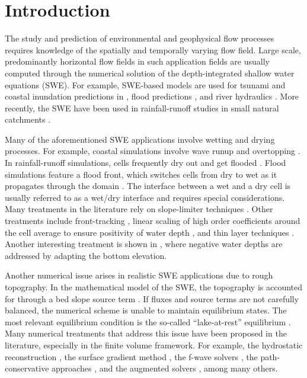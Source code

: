 \section{Introduction}

The study and prediction of environmental and geophysical flow
processes requires knowledge of the spatially and temporally varying
flow field.  Large scale, predominantly horizontal flow fields in such
application fields are usually computed through the numerical solution
of the depth-integrated shallow water equations (SWE).  For example,
SWE-based models are used for tsunami and coastal inundation
predictions in \cite{Marras:2016, Vater2019, Qin:2019}, flood
predictions \cite{George2011, Echeverribar2019}, and river hydraulics
\cite{Persi:2019}.  More recently, the SWE have been used in
rainfall-runoff studies in small natural catchments \cite{Mugler2011,
  Lacasta2014, Simons2014, Xia2019, CaviedesVoullieme2020}.

Many of the aforementioned SWE applications involve wetting and drying
processes.  For example, coastal simulations involve wave runup and
overtopping \cite{Vater20151, Medeiros2013, Vater2019}. In
rainfall-runoff simulations, cells frequently dry out and get flooded
\cite{Simons2014, Lacasta2014, Xia2017}. Flood simulations feature a
flood front, which switches cells from dry to wet as it propagates
through the domain \cite{George2011}.  The interface between a wet and
a dry cell is usually referred to as a wet/dry interface
\cite{Bollermann2013, Beisiegel2015} and requires special
considerations.  Many treatments in the literature rely on
slope-limiter techniques \cite{Beisiegel2015, Vater20151, Vater2019,
  Le:2020}.  Other treatments include front-tracking \cite{ref1,
  Ambati2007452}, linear scaling of high order coefficients around the
cell average to ensure positivity of water depth \cite{xing2010,
  Marras:2016}, and thin layer techniques \cite{ern2008, cotoJe,
  Lee:2016}. Another interesting treatment is shown in
\cite{Karna:2011}, where negative water depths are addressed by
adapting the bottom elevation.

Another numerical issue arises in realistic SWE applications due to
rough topography.  In the mathematical model of the SWE, the
topography is accounted for through a bed slope source term
\cite{Kesserwani2013}.  If fluxes and source terms are not carefully
balanced, the numerical scheme is unable to maintain equilibrium
states.  The most relevant equilibrium condition is the so-called
``lake-at-rest'' equilibrium \cite{bermude2}.  Many numerical
treatments that address this issue have been proposed in the
literature, especially in the finite volume framework.  For example,
the hydrostatic reconstruction \cite{audusse}, the surface gradient
method \cite{zhou}, the f-wave solvers \cite{George:2008,
  LeVeque:2011}, the path-conservative approaches \cite{Gosse:2001,
  LeVeque:2011}, and the augmented solvers \cite{NavasMontilla2020},
among many others.

